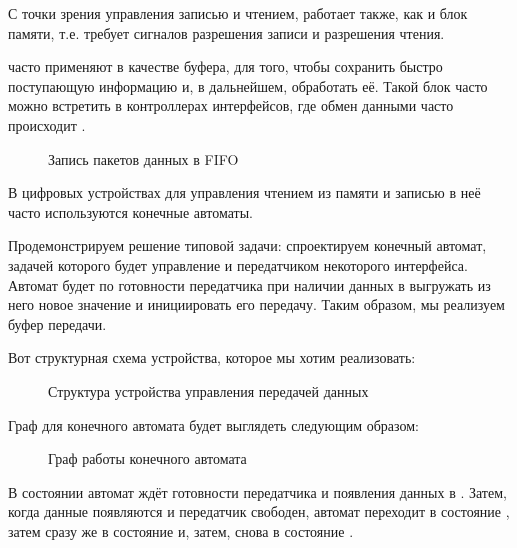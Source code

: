 \par{С точки зрения управления записью и чтением,  работает также, как и блок  памяти, т.е. требует сигналов разрешения записи и разрешения чтения.}

\vspace{4mm}

\par{ часто применяют в качестве буфера, для того, чтобы сохранить быстро поступающую информацию и, в дальнейшем, обработать её. Такой блок часто можно встретить в контроллерах интерфейсов, где обмен данными часто происходит .}

\begin{figure}[H]
	\centering
	\def\svgwidth{\columnwidth}
	
	\caption{Запись пакетов данных в FIFO}
\end{figure}

\par{В цифровых устройствах для управления чтением из памяти и записью в неё часто используются конечные автоматы.}

\par{Продемонстрируем решение типовой задачи: спроектируем конечный автомат, задачей которого будет управление  и передатчиком некоторого интерфейса. Автомат будет по готовности передатчика при наличии данных в  выгружать из него новое значение и инициировать его передачу. Таким образом, мы реализуем буфер передачи.}

\vspace{4mm}

\par{Вот структурная схема устройства, которое мы хотим реализовать:}

\begin{figure}[H]
	\centering
	\def\svgwidth{\columnwidth}
	
	\caption{Структура устройства управления передачей данных}
\end{figure}

\par{Граф для конечного автомата будет выглядеть следующим образом:}

\begin{figure}[H]
	\centering
	\def\svgwidth{12cm}
	
	\caption{Граф работы конечного автомата}
\end{figure}

\par{В состоянии  автомат ждёт готовности передатчика и появления данных в . Затем, когда данные появляются и передатчик свободен, автомат переходит в состояние , затем сразу же в состояние  и, затем, снова в состояние .}


